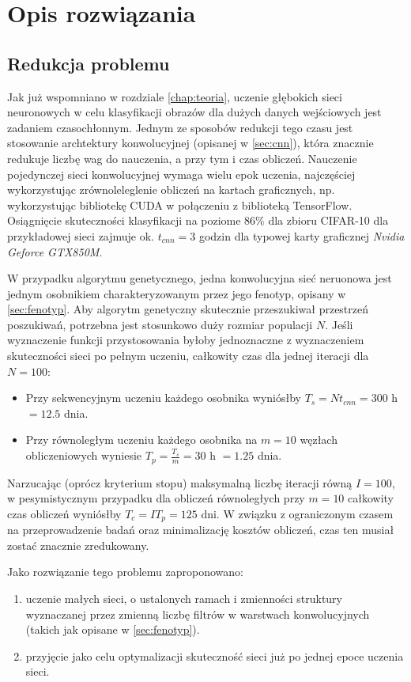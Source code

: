 \chapter{Opis rozwiązania}
\section{Redukcja problemu}\label{sec:reduction}
Jak już wspomniano w rozdziale \ref{chap:teoria}, uczenie głębokich sieci neuronowych w celu klasyfikacji obrazów dla dużych danych wejściowych jest zadaniem czasochłonnym.
Jednym ze sposobów redukcji tego czasu jest stosowanie archtektury konwolucyjnej (opisanej w \ref{sec:cnn}), która znacznie redukuje liczbę wag do nauczenia, a przy tym i czas obliczeń.
Nauczenie pojedynczej sieci konwolucyjnej wymaga wielu epok uczenia, najczęściej wykorzystując zrównoleleglenie obliczeń na kartach graficznych, np. wykorzystując bibliotekę CUDA w połączeniu z biblioteką TensorFlow.
Osiągnięcie skuteczności klasyfikacji na poziome 86\% dla zbioru CIFAR-10 dla przykładowej sieci zajmuje ok. $t_{cnn} = 3$ godzin dla typowej karty graficznej \textit{Nvidia Geforce GTX850M}. \cite{tensorflow2015-whitepaper}

W przypadku algorytmu genetycznego, jedna konwolucyjna sieć neruonowa jest jednym osobnikiem charakteryzowanym przez jego fenotyp, opisany w \ref{sec:fenotyp}.
Aby algorytm genetyczny skutecznie przeszukiwał przestrzeń poszukiwań, potrzebna jest stosunkowo duży rozmiar populacji $N$.
Jeśli wyznaczenie funkcji przystosowania byłoby jednoznaczne z wyznaczeniem skuteczności sieci po pełnym uczeniu, całkowity czas dla jednej iteracji dla $N = 100$:
 \begin{itemize}
	\item Przy sekwencyjnym uczeniu każdego osobnika wyniósłby $T_s = Nt_{cnn} = 300$ h$ =  12.5 $ dnia.
	\item Przy równoległym uczeniu każdego osobnika na $m = 10$ węzłach obliczeniowych wyniesie $T_p = \frac{T_s}{m} = 30$ h $= 1.25$ dnia.
\end{itemize}
Narzucając (oprócz kryterium stopu) maksymalną liczbę iteracji równą $I = 100$, w pesymistycznym przypadku dla obliczeń równoległych przy $m = 10$ całkowity czas obliczeń wyniósłby $T_c=IT_p=125$ dni.
W związku z ograniczonym czasem na przeprowadzenie badań oraz minimalizację kosztów obliczeń, czas ten musiał zostać znacznie zredukowany.

Jako rozwiązanie tego problemu zaproponowano:
\begin{enumerate}
	\item uczenie małych sieci, o ustalonych ramach i zmienności struktury wyznaczanej przez zmienną liczbę filtrów w warstwach konwolucyjnych (takich jak opisane w \ref{sec:fenotyp}).
	\item przyjęcie jako celu optymalizacji skuteczność sieci już po jednej epoce uczenia sieci.
\end{enumerate}

